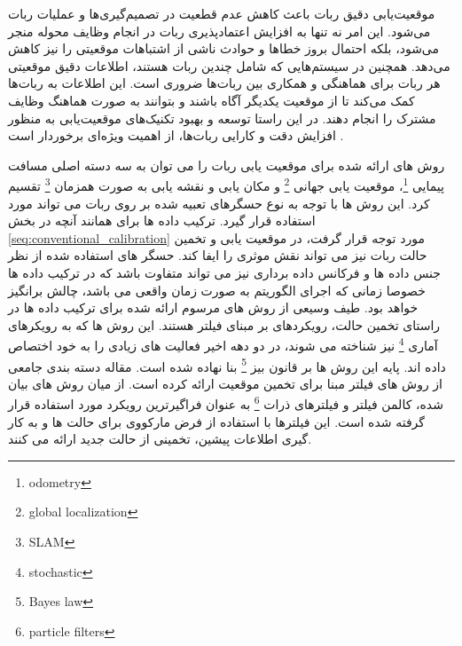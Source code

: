 موقعیت‌یابی دقیق ربات باعث کاهش عدم قطعیت در تصمیم‌گیری‌ها و عملیات ربات می‌شود. این امر نه تنها به افزایش اعتمادپذیری ربات در انجام وظایف محوله منجر می‌شود، بلکه احتمال بروز خطاها و حوادث ناشی از اشتباهات موقعیتی را نیز کاهش می‌دهد. همچنین در سیستم‌هایی که شامل چندین ربات هستند، اطلاعات دقیق موقعیتی هر ربات برای هماهنگی و همکاری بین ربات‌ها ضروری است. این اطلاعات به ربات‌ها کمک می‌کند تا از موقعیت یکدیگر آگاه باشند و بتوانند به صورت هماهنگ وظایف مشترک را انجام دهند. در این راستا توسعه و بهبود تکنیک‌های موقعیت‌یابی به منظور افزایش دقت و کارایی ربات‌ها، از اهمیت ویژه‌ای برخوردار است
\cite{aragues2011multi}.


روش های ارائه شده برای موقعیت یابی ربات را می توان به سه دسته اصلی مسافت پیمایی
\footnote{odometry}،
موقعیت یابی جهانی
\footnote{global localization}
و مکان یابی و نقشه یابی به صورت همزمان
\footnote{SLAM}
تقسیم کرد. این روش ها با توجه به نوع حسگرهای تعبیه شده بر روی ربات می تواند مورد استفاده قرار گیرد. ترکیب داده ها برای همانند آنچه در بخش
\ref{seq:conventional_calibration}
مورد توجه قرار گرفت، در موقعیت یابی و تخمین حالت ربات نیز می تواند نقش موثری را ایفا کند. حسگر های استفاده شده از نظر جنس داده ها و فرکانس داده برداری نیز می تواند متفاوت باشد که در ترکیب داده ها خصوصا زمانی که اجرای الگوریتم به صورت زمان واقعی می باشد، چالش برانگیز خواهد بود. طیف وسیعی از روش های مرسوم ارائه شده برای ترکیب داده ها در راستای تخمین حالت، رویکردهای بر مبنای فیلتر هستند. این روش ها که به رویکرهای آماری 
\footnote{stochastic}
نیز شناخته می شوند، در دو دهه اخیر فعالیت های زیادی را به خود اختصاص داده اند. پایه این روش ها بر قانون بیز
\footnote{Bayes law}
بنا نهاده شده است. مقاله
\cite{panigrahi2022localization} 
دسته بندی جامعی از روش های فیلتر مبنا برای تخمین موقعیت ارائه کرده است. از میان روش های بیان شده، کالمن فیلتر و فیلترهای ذرات
\footnote{particle filters}
به عنوان فراگیرترین رویکرد مورد استفاده قرار گرفته شده است. این فیلترها با استفاده از فرض مارکووی برای حالت ها و به کار گیری اطلاعات پیشین، تخمینی از حالت جدید ارائه می کنند. 

